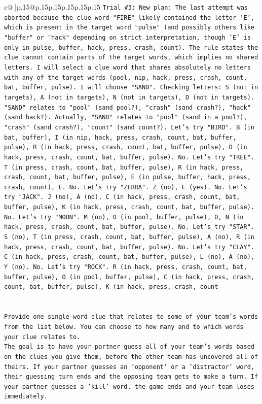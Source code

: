 \documentclass{article}
\begin{document}
{\begin{supertabular}{c@{$\;$}|p{.15\linewidth}@{}p{.15\linewidth}p{.15\linewidth}p{.15\linewidth}p{.15\linewidth}p{.15\linewidth}}
{{{\texttt{Trial \#3: New plan: The last attempt was aborted because the clue word "FIRE" likely contained the letter 'E', which is present in the target word "pulse" (and possibly others like "buffer" or "hack" depending on strict interpretation, though 'E' is only in pulse, buffer, hack, press, crash, count). The rule states the clue cannot contain parts of the target words, which implies no shared letters. I will select a clue word that shares absolutely no letters with any of the target words (pool, nip, hack, press, crash, count, bat, buffer, pulse). I will choose "SAND". Checking letters: S (not in targets), A (not in targets), N (not in targets), D (not in targets). "SAND" relates to "pool" (sand pool?), "crash" (sand crash?), "hack" (sand hack?). Actually, "SAND" relates to "pool" (sand in a pool?), "crash" (sand crash?), "count" (sand count?). Let's try "BIRD". B (in bat, buffer), I (in nip, hack, press, crash, count, bat, buffer, pulse), R (in hack, press, crash, count, bat, buffer, pulse), D (in hack, press, crash, count, bat, buffer, pulse). No. Let's try "TREE". T (in press, crash, count, bat, buffer, pulse), R (in hack, press, crash, count, bat, buffer, pulse), E (in pulse, buffer, hack, press, crash, count), E. No. Let's try "ZEBRA". Z (no), E (yes). No. Let's try "JACK". J (no), A (no), C (in hack, press, crash, count, bat, buffer, pulse), K (in hack, press, crash, count, bat, buffer, pulse). No. Let's try "MOON". M (no), O (in pool, buffer, pulse), O, N (in hack, press, crash, count, bat, buffer, pulse). No. Let's try "STAR". S (no), T (in press, crash, count, bat, buffer, pulse), A (no), R (in hack, press, crash, count, bat, buffer, pulse). No. Let's try "CLAY". C (in hack, press, crash, count, bat, buffer, pulse), L (no), A (no), Y (no). No. Let's try "ROCK". R (in hack, press, crash, count, bat, buffer, pulse), O (in pool, buffer, pulse), C (in hack, press, crash, count, bat, buffer, pulse), K (in hack, press, crash, count} \\
\\ 
\\ 
\texttt{Provide one single{-}word clue that relates to some of your team's words from the list below. You can choose to how many and to which words your clue relates to.} \\
\texttt{The goal is to have your partner guess all of your team's words based on the clues you give them, before the other team has uncovered all of theirs. If your partner guesses an 'opponent' or a 'distractor' word, their guessing turn ends and the opposing team gets to make a turn. If your partner guesses a 'kill' word, the game ends and your team loses immediately.} \\
}}}
\end{supertabular}}
\end{document}

